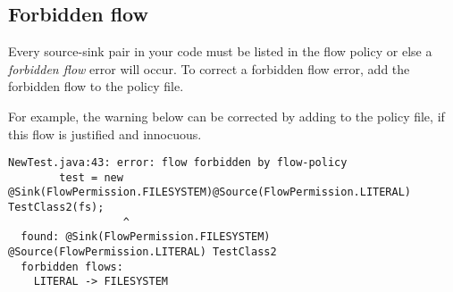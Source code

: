 \subsection{Forbidden flow}  
Every source-sink pair in your code must be listed in the flow policy or else a \emph{forbidden flow} error will occur.
To correct a forbidden flow error, add the forbidden flow to the policy file. 
  
For example, the warning below can be corrected by adding   to the policy file, if this flow is justified and innocuous. 
\begin{Verbatim}
NewTest.java:43: error: flow forbidden by flow-policy  
        test = new @Sink(FlowPermission.FILESYSTEM)@Source(FlowPermission.LITERAL) TestClass2(fs);
                  ^
  found: @Sink(FlowPermission.FILESYSTEM) @Source(FlowPermission.LITERAL) TestClass2 
  forbidden flows:
    LITERAL -> FILESYSTEM
\end{Verbatim}





